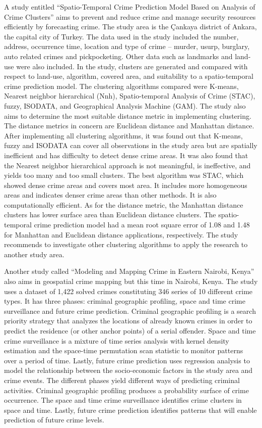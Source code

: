     A study entitled “Spatio-Temporal Crime Prediction Model Based on Analysis of Crime Clusters” \citep{polat2007spatio} aims to prevent and reduce crime and manage security resources efficiently by forecasting crime. The study area is the Çankaya district of Ankara, the capital city of Turkey. The data used in the study included the number, address, occurrence time, location and type of crime – murder, usurp, burglary, auto related crimes and pickpocketing. Other data such as landmarks and land-use were also included. In the study, clusters are generated and compared with respect to land-use, algorithm, covered area, and suitability to a spatio-temporal crime prediction model. The clustering algorithms compared were K-means, Nearest neighbor hierarchical (Nnh), Spatio-temporal Analysis of Crime (STAC), fuzzy, ISODATA, and Geographical Analysis Machine (GAM). The study also aims to determine the most suitable distance metric in implementing clustering. The distance metrics in concern are Euclidean distance and Manhattan distance. After implementing all clustering algorithms, it was found out that K-means, fuzzy and ISODATA can cover all observations in the study area but are spatially inefficient and has difficulty to detect dense crime areas. It was also found that the Nearest neighbor hierarchical approach is not meaningful, is ineffective, and yields too many and too small clusters. The best algorithm was STAC, which showed dense crime areas and covers most area. It includes more homogeneous areas and indicates denser crime areas than other methods. It is also computationally efficient. As for the distance metric, the Manhattan distance clusters has lower surface area than Euclidean distance clusters. The spatio-temporal crime prediction model had a mean root square error of 1.08 and 1.48 for Manhattan and Euclidean distance applications, respectively. The study recommends to investigate other clustering algorithms to apply the research to another study area.

    Another study called “Modeling and Mapping Crime in Eastern Nairobi, Kenya” \citep{mburu2014modeling} also aims in geospatial crime mapping but this time in Nairobi, Kenya. The study uses a dataset of 1,422 solved crimes constituting 346 series of 10 different crime types. It has three phases: criminal geographic profiling, space and time crime surveillance and future crime prediction. Criminal geographic profiling is a search priority strategy that analyzes the locations of already known crimes in order to predict the residence (or other anchor points) of a serial offender. Space and time crime surveillance is a mixture of time series analysis with kernel density estimation and the space-time permutation scan statistic to monitor patterns over a period of time. Lastly, future crime prediction uses regression analysis to model the relationship between the socio-economic factors in the study area and crime events. The different phases yield different ways of predicting criminal activities. Criminal geographic profiling produces a probability surface of crime occurrence. The space and time crime surveillance identifies crime clusters in space and time. Lastly, future crime prediction identifies patterns that will enable prediction of future crime levels.

